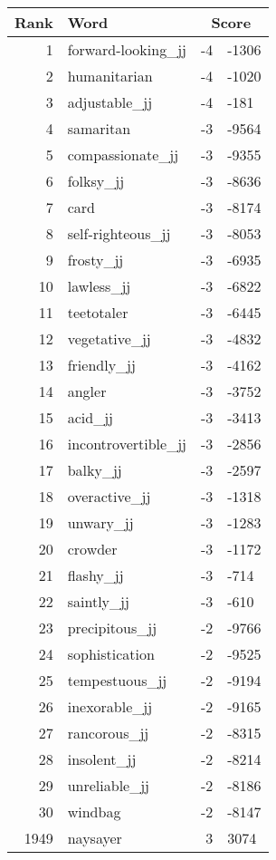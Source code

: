 \begin{longtable}[!htbp]{| rlr@{.}l |}
    \hline
    \textbf{Rank} & \textbf{Word} & \multicolumn{2}{c|}{\textbf{Score}} \\
    \hline
    \endhead
    1 & forward-looking\_jj & -4 & -1306 \\
    2 & humanitarian & -4 & -1020 \\
    3 & adjustable\_jj & -4 & -181 \\
    4 & samaritan & -3 & -9564 \\
    5 & compassionate\_jj & -3 & -9355 \\
    6 & folksy\_jj & -3 & -8636 \\
    7 & card & -3 & -8174 \\
    8 & self-righteous\_jj & -3 & -8053 \\
    9 & frosty\_jj & -3 & -6935 \\
    10 & lawless\_jj & -3 & -6822 \\
    11 & teetotaler & -3 & -6445 \\
    12 & vegetative\_jj & -3 & -4832 \\
    13 & friendly\_jj & -3 & -4162 \\
    14 & angler & -3 & -3752 \\
    15 & acid\_jj & -3 & -3413 \\
    16 & incontrovertible\_jj & -3 & -2856 \\
    17 & balky\_jj & -3 & -2597 \\
    18 & overactive\_jj & -3 & -1318 \\
    19 & unwary\_jj & -3 & -1283 \\
    20 & crowder & -3 & -1172 \\
    21 & flashy\_jj & -3 & -714 \\
    22 & saintly\_jj & -3 & -610 \\
    23 & precipitous\_jj & -2 & -9766 \\
    24 & sophistication & -2 & -9525 \\
    25 & tempestuous\_jj & -2 & -9194 \\
    26 & inexorable\_jj & -2 & -9165 \\
    27 & rancorous\_jj & -2 & -8315 \\
    28 & insolent\_jj & -2 & -8214 \\
    29 & unreliable\_jj & -2 & -8186 \\
    30 & windbag & -2 & -8147 \\
    1949 & naysayer & 3 & 3074 \\

\end{longtable}
